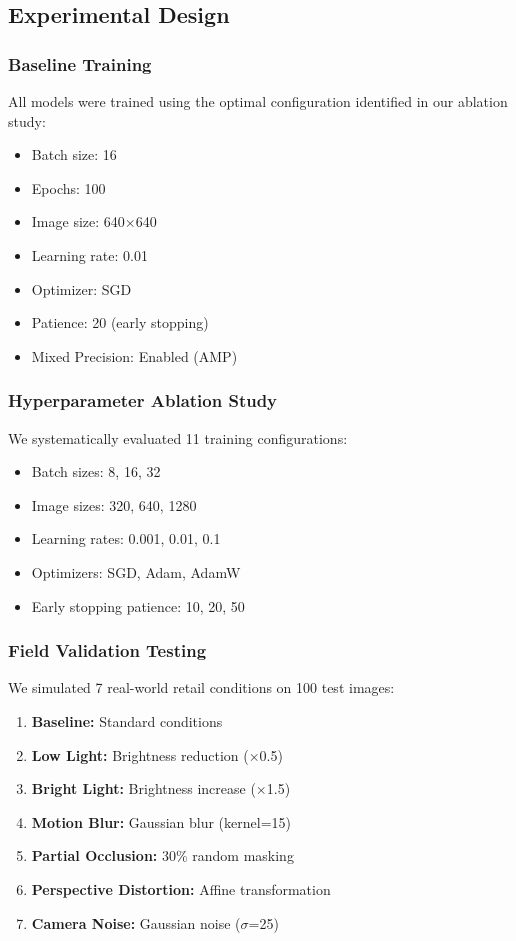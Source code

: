 \documentclass[conference]{IEEEtran}
\begin{document}
\subsection{Experimental Design}

\subsubsection{Baseline Training}
All models were trained using the optimal configuration identified in our ablation study:
\begin{itemize}
    \item Batch size: 16
    \item Epochs: 100
    \item Image size: 640×640
    \item Learning rate: 0.01
    \item Optimizer: SGD
    \item Patience: 20 (early stopping)
    \item Mixed Precision: Enabled (AMP)
\end{itemize}

\subsubsection{Hyperparameter Ablation Study}
We systematically evaluated 11 training configurations:
\begin{itemize}
    \item Batch sizes: 8, 16, 32
    \item Image sizes: 320, 640, 1280
    \item Learning rates: 0.001, 0.01, 0.1
    \item Optimizers: SGD, Adam, AdamW
    \item Early stopping patience: 10, 20, 50
\end{itemize}

\subsubsection{Field Validation Testing}
We simulated 7 real-world retail conditions on 100 test images:
\begin{enumerate}
    \item \textbf{Baseline:} Standard conditions
    \item \textbf{Low Light:} Brightness reduction (×0.5)
    \item \textbf{Bright Light:} Brightness increase (×1.5)
    \item \textbf{Motion Blur:} Gaussian blur (kernel=15)
    \item \textbf{Partial Occlusion:} 30\% random masking
    \item \textbf{Perspective Distortion:} Affine transformation
    \item \textbf{Camera Noise:} Gaussian noise ($\sigma$=25)
\end{enumerate}
\end{document}
